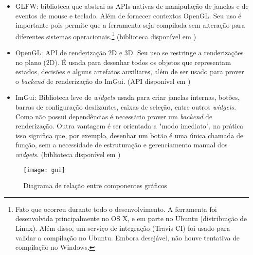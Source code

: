 \begin{itemize}
  \item GLFW: biblioteca que abstrai as APIs nativas de manipulação de janelas e
    de eventos de mouse e teclado.  Além de fornecer contextos OpenGL.  Seu uso
    é importante pois permite que a ferramenta seja compilada sem alteração para
    diferentes sistemas operacionais.\footnote{Fato que ocorreu durante todo o
      desenvolvimento.  A ferramenta foi desenvolvida principalmente no OS X, e
      em parte no Ubuntu (distribuição de Linux).  Além disso, um serviço de
      integração (Travis CI) foi usado para validar a compilação no Ubuntu.
    Embora desejável, não houve tentativa de compilação no Windows.} (biblioteca
    disponível em \cite{glfwdocs})
  \item OpenGL: API de renderização 2D e 3D.  Seu uso se restringe a
    renderizações no plano (2D).  É usada para desenhar todos os objetos que
    representam estados, decisões e alguns artefatos auxiliares, além de ser
    usado para prover o \textit{backend} de renderização do ImGui. (API
    disponível em \cite{opengldocs})
  \item ImGui: Biblioteca leve de \textit{widgets} usada para criar janelas
    internas, botões, barras de configuração deslizantes, caixas de seleção,
    entre outros \textit{widgets}.  Como não possui dependências é necessário
    prover um \textit{backend} de renderização.  Outra vantagem é ser orientada
    a "modo imediato", na prática isso significa que, por exemplo, desenhar um
    botão é uma única chamada de função, sem a necessidade de estruturação e
    gerenciamento manual dos \textit{widgets}. (biblioteca disponível em
    \cite{imguigithub})
\end{itemize}

\begin{figure}[H]
  \centering
  \texttt{[image: gui]}
  \caption{Diagrama de relação entre componentes gráficos}\label{fig:arch_gui}
\end{figure}

